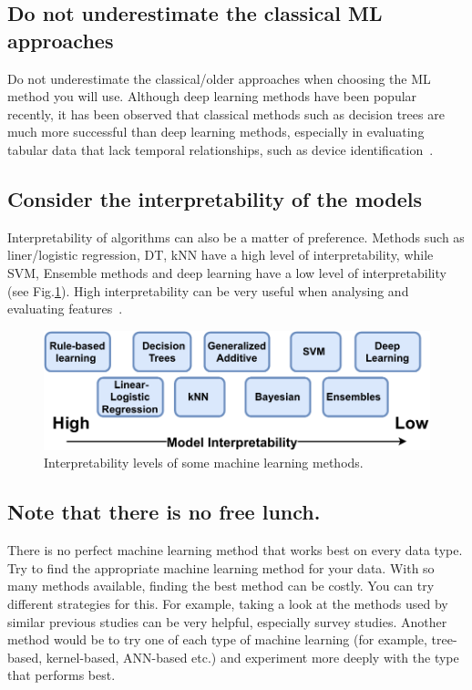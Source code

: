 \documentclass[journal]{IEEEtran}
\begin{document}
\subsection{Do not underestimate the classical ML approaches}
Do not underestimate the classical/older approaches when choosing the ML method you will use. Although deep learning methods have been popular recently, it has been observed that classical methods such as decision trees are much more successful than deep learning methods, especially in evaluating tabular data that lack temporal relationships, such as device identification~\cite{lundberg2020local2global}. 

\subsection{Consider the interpretability of the models}
Interpretability of algorithms can also be a matter of preference. Methods such as liner/logistic regression, DT, kNN have a high level of interpretability, while SVM, Ensemble methods and deep learning have a low level of interpretability (see Fig.\ref{fig:interpretability}). High interpretability can be very useful when analysing and evaluating features~\cite{arrieta2020explainable}.
\begin{figure}[ht]
	\centerline{\includegraphics[width=1\columnwidth]{images/ModelInterpretability.pdf}}
	\caption{Interpretability levels of some machine learning methods.}
	\label{fig:interpretability}
\end{figure}
\subsection{Note that there is no free lunch.}
There is no perfect machine learning method that works best on every data type\cite{wolpert2002supervised}. Try to find the appropriate machine learning method for your data. With so many methods available, finding the best method can be costly. You can try different strategies for this. For example, taking a look at the methods used by similar previous studies can be very helpful, especially survey studies. Another method would be to try one of each type of machine learning (for example, tree-based, kernel-based, ANN-based etc.) and experiment more deeply with the type that performs best.
\end{document}
